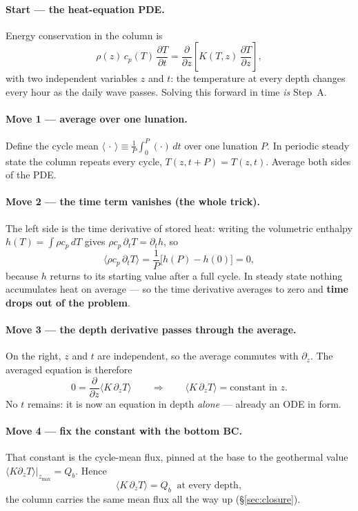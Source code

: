 \documentclass[11pt]{report}
\begin{document}
\paragraph{Start --- the heat-equation PDE.} Energy conservation in the column is
\[
\rho(z)\,c_p(T)\,\frac{\partial T}{\partial t}
=\frac{\partial}{\partial z}\!\left[K(T,z)\,\frac{\partial T}{\partial z}\right],
\]
with two independent variables $z$ and $t$: the temperature at every depth changes
every hour as the daily wave passes. Solving this forward in time \emph{is} Step~A.

\paragraph{Move 1 --- average over one lunation.} Define the cycle mean
$\langle\,\cdot\,\rangle\equiv\frac1P\int_0^P(\cdot)\,dt$ over one lunation $P$. In
periodic steady state the column repeats every cycle, $T(z,t{+}P)=T(z,t)$. Average both
sides of the PDE.

\paragraph{Move 2 --- the time term vanishes (the whole trick).} The left side is the
time derivative of stored heat: writing the volumetric enthalpy $h(T)=\int\rho c_p\,dT$
gives $\rho c_p\,\partial_t T=\partial_t h$, so
\[
\bigl\langle \rho c_p\,\partial_t T\bigr\rangle
=\frac1P\bigl[h(P)-h(0)\bigr]=0,
\]
because $h$ returns to its starting value after a full cycle. In steady state nothing
accumulates heat on average --- so the time derivative averages to zero and
\textbf{time drops out of the problem}.

\paragraph{Move 3 --- the depth derivative passes through the average.} On the right,
$z$ and $t$ are independent, so the average commutes with $\partial_z$. The averaged
equation is therefore
\[
0=\frac{\partial}{\partial z}\bigl\langle K\,\partial_z T\bigr\rangle
\qquad\Longrightarrow\qquad
\bigl\langle K\,\partial_z T\bigr\rangle=\text{constant in }z.
\]
No $t$ remains: it is now an equation in depth \emph{alone} --- already an ODE in form.

\paragraph{Move 4 --- fix the constant with the bottom BC.} That constant is the
cycle-mean flux, pinned at the base to the geothermal value
$\langle K\partial_z T\rangle|_{z_{\max}}=Q_b$. Hence
\[
\boxed{\;\bigl\langle K\,\partial_z T\bigr\rangle=Q_b\ \text{ at every depth},\;}
\]
the column carries the same mean flux all the way up (\S\ref{sec:closure}).
\end{document}
